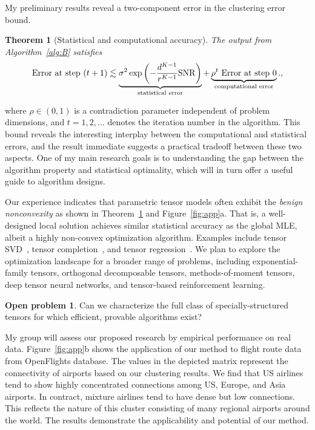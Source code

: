 \documentclass[11pt]{article}
\DeclareRobustCommand{\mybox}[2][gray!20]{%
\begin{tcolorbox}[   %
        breakable,
        left=0pt,
        right=0pt,
        top=0pt,
        bottom=0pt,
        colback=#1,
        colframe=#1,
        width=\dimexpr\textwidth\relax, 
        enlarge left by=0mm,
        boxsep=5pt,
        arc=0pt,outer arc=0pt,
        ]
        #2
\end{tcolorbox}}
\newcommand*{\KeepStyleUnderBrace}[1]{%
  \mathop{%
    \mathchoice
    {\underbrace{\displaystyle#1}}%
    {\underbrace{\textstyle#1}}%
    {\underbrace{\scriptstyle#1}}%
    {\underbrace{\scriptscriptstyle#1}}%
  }\limits
}
\DeclareRobustCommand{\mybox}[2][gray!20]{%
\begin{tcolorbox}[   %
        breakable,
        left=0pt,
        right=0pt,
        top=0pt,
        bottom=0pt,
        colback=#1,
        colframe=#1,
        width=\dimexpr\textwidth\relax, 
        enlarge left by=0mm,
        boxsep=5pt,
        arc=0pt,outer arc=0pt,
        ]
        #2
\end{tcolorbox}
}
\theoremstyle{exampstyle}
\newtheorem{thm}{Theorem}[section]
\theoremstyle{definition}
\newtheorem{open}[]{Open problem}
\newcommand{\SNR}{{\rm SNR}}
\begin{document}
My preliminary results reveal a two-component error in the clustering error bound. 
\begin{thm}[Statistical and computational accuracy]\label{nonconvexity} The output from Algorithm~\ref{alg:B} satisfies
\[
\text{Error at step $(t+1)$}\lesssim \KeepStyleUnderBrace{\sigma^2\exp\left(-{d^{K-1}\over r^{K-1}}\SNR\right)}_{\text{statistical error}} + \KeepStyleUnderBrace{\rho^{t}\ \text{Error at step $0$}}_{\text{computational error}}.,
\]
\end{thm}
\vspace{-.3cm}
where  $\rho\in(0,1)$ is a contradiction parameter independent of problem dimensions, and $t=1, 2, \ldots$ denotes the iteration number in the algorithm. This bound reveals the interesting interplay between the computational and statistical errors, and the result immediate suggests a practical tradeoff between these two aspects. One of my main research goals is to understanding the gap between the algorithm property and statistical optimality, which will in turn offer a useful guide to algorithm designs.

Our experience indicates that parametric tensor models often exhibit the \emph{benign nonconvexity} as shown in Theorem~\ref{nonconvexity} and Figure~\ref{fig:app}a. That is, a well-designed local solution achieves similar statistical accuracy as the global MLE, albeit a highly non-convex optimization algorithm. Examples include tensor SVD~\cite{wang2018learning}, tensor completion~\cite{pmlr-v119-lee20i}, and tensor regression~\cite{han2020optimal}. We plan to explore the optimization landscape for a broader range of problems, including exponential-family tensors, orthogonal decomposable tensors, methods-of-moment tensors, deep tensor neural networks, and tensor-based reinforcement learning. 

\mybox[gray!20]{\begin{open} 
Can we characterize the full class of specially-structured tensors for which efficient, provable algorithms exist?\
\end{open}}

My group will assess our proposed research by empirical performance on real data. Figure~\ref{fig:app}b shows the application of our method to flight route data from OpenFlights database. The values in the depicted matrix represent the connectivity of airports based on our clustering results. We find that US airlines tend to show highly concentrated connections among US, Europe, and Asia airports. In contract, mixture airlines tend to have dense but low connections. This reflects the nature of this cluster consisting of many regional airports around the world. The results demonstrate the applicability and potential of our method.
\end{document}
